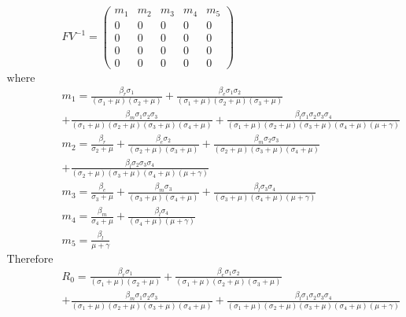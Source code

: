 \begin{align*}
&FV^{-1}= \left(\begin{array}{rrrrr}
m_1 & m_2 & m_3 & m_4 & m_5 \\
0 & 0 & 0 & 0 & 0 \\
0 & 0 & 0 & 0 & 0 \\
0 & 0 & 0 & 0 & 0 \\
0 & 0 & 0 & 0 & 0
\end{array}\right)\\
\textrm{where} \\
&m_1 = \frac{\beta_r \sigma_{1}}{{\left(\sigma_{1} + \mu\right)} {\left(\sigma_{2} + \mu\right)}} + \frac{\beta_e \sigma_{1} \sigma_{2}}{{\left(\sigma_{1} + \mu\right)} {\left(\sigma_{2} + \mu\right)} {\left(\sigma_{3} + \mu\right)}} \\
&+ \frac{\beta_m \sigma_{1} \sigma_{2} \sigma_{3}}{{\left(\sigma_{1} + \mu\right)} {\left(\sigma_{2} + \mu\right)} {\left(\sigma_{3} + \mu\right)} {\left(\sigma_{4} + \mu\right)}} + \frac{\beta_l \sigma_{1} \sigma_{2} \sigma_{3} \sigma_{4}}{{\left(\sigma_{1} + \mu\right)} {\left(\sigma_{2} + \mu\right)} {\left(\sigma_{3} + \mu\right)} {\left(\sigma_{4} + \mu\right)} {\left(\mu + \gamma\right)}} \\
&m_2= \frac{\beta_r}{\sigma_{2} + \mu} + \frac{\beta_e \sigma_{2}}{{\left(\sigma_{2} + \mu\right)} {\left(\sigma_{3} + \mu\right)}} + \frac{\beta_m \sigma_{2} \sigma_{3}}{{\left(\sigma_{2} + \mu\right)} {\left(\sigma_{3} + \mu\right)} {\left(\sigma_{4} + \mu\right)}} \\ & + \frac{\beta_l \sigma_{2} \sigma_{3} \sigma_{4}}{{\left(\sigma_{2} + \mu\right)} {\left(\sigma_{3} + \mu\right)} {\left(\sigma_{4} + \mu\right)} {\left(\mu + \gamma\right)}} \\
&m_3= \frac{\beta_e}{\sigma_{3} + \mu} + \frac{\beta_m \sigma_{3}}{{\left(\sigma_{3} + \mu\right)} {\left(\sigma_{4} + \mu\right)}} + \frac{\beta_l \sigma_{3} \sigma_{4}}{{\left(\sigma_{3} + \mu\right)} {\left(\sigma_{4} + \mu\right)} {\left(\mu + \gamma\right)}} \\
&m_4= \frac{\beta_m}{\sigma_{4} + \mu} + \frac{\beta_l \sigma_{4}}{{\left(\sigma_{4} + \mu\right)} {\left(\mu + \gamma\right)}} \\
&m_5= \frac{\beta_l}{\mu + \gamma} \\
\textrm{Therefore} \\
&R_0 = \frac{\beta_r \sigma_{1}}{{\left(\sigma_{1} + \mu\right)} {\left(\sigma_{2} + \mu\right)}} + \frac{\beta_e \sigma_{1} \sigma_{2}}{{\left(\sigma_{1} + \mu\right)} {\left(\sigma_{2} + \mu\right)} {\left(\sigma_{3} + \mu\right)}} \\
&+ \frac{\beta_m \sigma_{1} \sigma_{2} \sigma_{3}}{{\left(\sigma_{1} + \mu\right)} {\left(\sigma_{2} + \mu\right)} {\left(\sigma_{3} + \mu\right)} {\left(\sigma_{4} + \mu\right)}} + \frac{\beta_l \sigma_{1} \sigma_{2} \sigma_{3} \sigma_{4}}{{\left(\sigma_{1} + \mu\right)} {\left(\sigma_{2} + \mu\right)} {\left(\sigma_{3} + \mu\right)} {\left(\sigma_{4} + \mu\right)} {\left(\mu + \gamma\right)}}
\end{align*}
